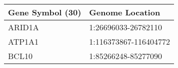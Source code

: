 \begin{tabular}{ll}
\toprule
Gene Symbol (30) &       Genome Location \\
\midrule
          ARID1A &   1:26696033-26782110 \\
          ATP1A1 & 1:116373867-116404772 \\
           BCL10 &   1:85266248-85277090 \\
\bottomrule
\end{tabular}
